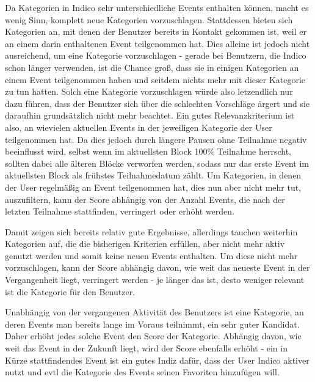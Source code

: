 Da Kategorien in Indico sehr unterschiedliche Events enthalten können, macht es wenig Sinn, komplett
neue Kategorien vorzuschlagen. Stattdessen bieten sich Kategorien an, mit denen der Benutzer bereits
in Kontakt gekommen ist, weil er an einem darin enthaltenen Event teilgenommen hat. Dies alleine ist
jedoch nicht ausreichend, um eine Kategorie vorzuschlagen - gerade bei Benutzern, die Indico schon
länger verwenden, ist die Chance groß, dass sie in einigen Kategorien an einem Event teilgenommen
haben und seitdem nichts mehr mit dieser Kategorie zu tun hatten. Solch eine Kategorie vorzuschlagen
würde also letzendlich nur dazu führen, dass der Benutzer sich über die schlechten Vorschläge ärgert
und sie daraufhin grundsätzlich nicht mehr beachtet. Ein gutes Relevanzkriterium ist also, an
wievielen aktuellen Events in der jeweiligen Kategorie der User teilgenommen hat. Da dies jedoch
durch längere Pausen ohne Teilnahme negativ beeinflusst wird, selbst wenn im aktuellsten Block 100\%
Teilnahme herrscht, sollten dabei alle älteren Blöcke verworfen werden, sodass nur das erste Event
im aktuellsten Block als frühstes Teilnahmedatum zählt. Um Kategorien, in denen der User regelmäßig
an Event teilgenommen hat, dies nun aber nicht mehr tut, auszufiltern, kann der Score abhängig von
der Anzahl Events, die nach der letzten Teilnahme stattfinden, verringert oder erhöht werden.

Damit zeigen sich bereits relativ gute Ergebnisse, allerdings tauchen weiterhin Kategorien auf, die
die bisherigen Kriterien erfüllen, aber nicht mehr aktiv genutzt werden und somit keine neuen Events
enthalten. Um diese nicht mehr vorzuschlagen, kann der Score abhängig davon, wie weit das neueste
Event in der Vergangenheit liegt, verringert werden - je länger das ist, desto weniger relevant ist
die Kategorie für den Benutzer.

Unabhängig von der vergangenen Aktivität des Benutzers ist eine Kategorie, an deren Events man
bereits lange im Voraus teilnimmt, ein sehr guter Kandidat. Daher erhöht jedes solche Event den
Score der Kategorie. Abhängig davon, wie weit das Event in der Zukunft liegt, wird der Score
ebenfalls erhöht - ein in Kürze stattfindendes Event ist ein gutes Indiz dafür, dass der User Indico
aktiver nutzt und evtl die Kategorie des Events seinen Favoriten hinzufügen will.
